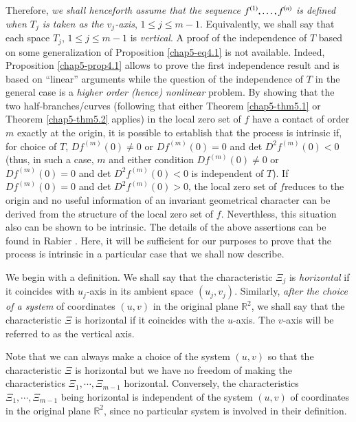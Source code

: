 Therefore, {\em we shall henceforth assume that the sequence $f^{(1)}, \ldots ,\break f^{(n)}$ is defined when $T_{j}$ is taken as the $v_{j}$-axis}, $1 \leq j \leq m-1$. Equivalently, we shall say that each space $T_{j}$, $1 \leq j \leq m-1$ is {\em vertical}. A proof of the independence of $T$ based on some generalization of Proposition \ref{chap5-eq4.1} is not available. Indeed, Proposition \ref{chap5-prop4.1} allows to prove the first independence result and is based on ``linear'' arguments while the question of the independence of $T$ in the general case is a {\em higher order (hence) nonlinear} problem. By showing that the two half-branches/curves (following that either Theorem \ref{chap5-thm5.1} or Theorem \ref{chap5-thm5.2} applies) in the local zero set of $f$ have a contact of order $m$ exactly at the origin, it is possible to establish that the process is intrinsic if, for choice of $T$, $Df^{(m)}(0) \neq 0$ or $Df^{(m)}(0) = 0$ and det $D^{2}f^{(m)} (0) < 0$ (thus, in such a case, $m$ and either condition $Df^{(m)}(0) \neq 0$ or $Df^{(m)} (0) = 0$ and det $D^{2}f^{(m)} (0) < 0$ is independent of $T$). If $Df^{(m)}(0) = 0$ and det $D^{2}f^{(m)} (0) > 0$, the local zero set of $f$\pageoriginale reduces to the origin and no useful information of an invariant geometrical character can be derived from the structure of the local zero set of $f$. Neverthless, this situation also can be shown to be intrinsic. The details of the above assertions can be found in Rabier \cite{32}. Here, it will be sufficient for our  purposes to prove that the process is intrinsic in a particular case that we shall now describe.

We begin with a definition. We shall say that the characteristic $\Xi_{j}$ is {\em horizontal} if it coincides with $u_{j}$-axis in its ambient space $(u_{j}, v_{j})$. Similarly, {\em after the choice of a system} of coordinates $(u, v)$ in the original plane $\mathbb{R}^{2}$, we shall say that the characteristic $\Xi$ is horizontal if it coincides with the $u$-axis. The $v$-axis will be referred to as the vertical axis.


\begin{remark}\label{chap5-rem6.1}
Note that we can always make a choice of the system $(u, v)$ so that the characteristic $\Xi$ is horizontal but we have no freedom of making the characteristics $\Xi_{1}, \cdots, \Xi_{m-1}$ horizontal. Conversely, the characteristics $\Xi_{1}, \cdots , \Xi_{m-1}$ being horizontal is independent of the system $(u, v)$ of coordinates in the original plane $\mathbb{R}^{2}$, since no particular system is involved in their definition.
\end{remark}

